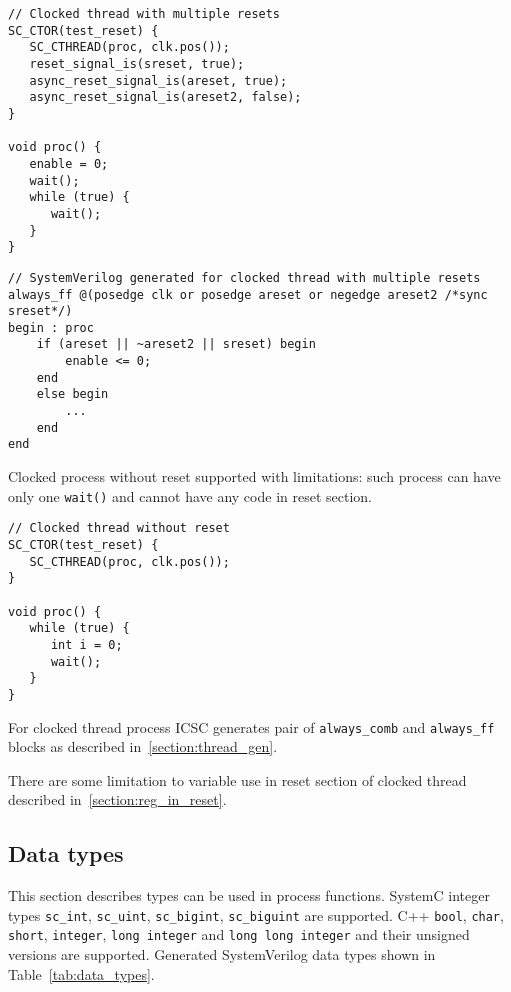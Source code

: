 \begin{lstlisting}[style=mycpp]
// Clocked thread with multiple resets
SC_CTOR(test_reset) {
   SC_CTHREAD(proc, clk.pos());
   reset_signal_is(sreset, true);
   async_reset_signal_is(areset, true);
   async_reset_signal_is(areset2, false);       
}

void proc() {
   enable = 0;
   wait();
   while (true) {
      wait();
   }
}
\end{lstlisting}
%
\begin{lstlisting}[style=mycpp]
// SystemVerilog generated for clocked thread with multiple resets
always_ff @(posedge clk or posedge areset or negedge areset2 /*sync sreset*/) 
begin : proc
    if (areset || ~areset2 || sreset) begin
        enable <= 0;        
    end
    else begin
        ...
    end
end
\end{lstlisting}

Clocked process without reset supported with limitations: such process can have only one {\tt wait()} and cannot have any code in reset section.

\begin{lstlisting}[style=mycpp]
// Clocked thread without reset
SC_CTOR(test_reset) {
   SC_CTHREAD(proc, clk.pos());
}

void proc() {
   while (true) {
      int i = 0;
      wait();
   }
}
\end{lstlisting}

For clocked thread process ICSC generates pair of {\tt always\_comb} and {\tt always\_ff} blocks as described in~\ref{section:thread_gen}.

There are some limitation to variable use in reset section of clocked thread described in~\ref{section:reg_in_reset}.

\subsection{Data types}

This section describes types can be used in process functions. 
SystemC integer types {\tt sc\_int}, {\tt sc\_uint}, {\tt sc\_bigint}, {\tt sc\_biguint} are supported. C++ {\tt bool}, {\tt char}, {\tt short}, {\tt integer}, {\tt long integer} and {\tt long long integer} and their unsigned versions are supported. Generated SystemVerilog data types shown in Table~\ref{tab:data_types}.

